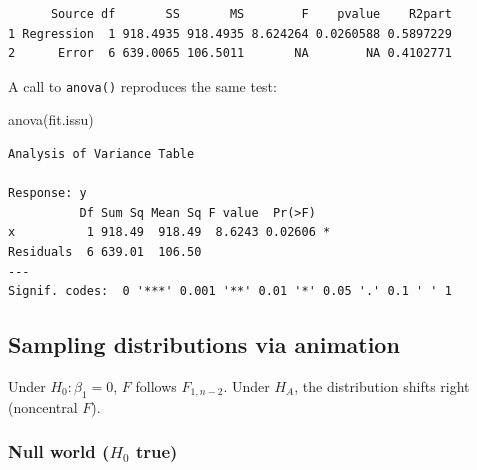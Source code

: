 \documentclass[
  letterpaper,
]{scrbook}
\newenvironment{Shaded}{\begin{snugshade}}{\end{snugshade}}
\newcommand{\FunctionTok}[1]{\textcolor[rgb]{0.28,0.35,0.67}{#1}}
\newcommand{\NormalTok}[1]{\textcolor[rgb]{0.00,0.23,0.31}{#1}}
\begin{document}
\begin{verbatim}
      Source df       SS       MS        F    pvalue    R2part
1 Regression  1 918.4935 918.4935 8.624264 0.0260588 0.5897229
2      Error  6 639.0065 106.5011       NA        NA 0.4102771
\end{verbatim}

A call to \texttt{anova()} reproduces the same test:

\begin{Shaded}
\begin{Highlighting}[]
\FunctionTok{anova}\NormalTok{(fit.issu)}
\end{Highlighting}
\end{Shaded}

\begin{verbatim}
Analysis of Variance Table

Response: y
          Df Sum Sq Mean Sq F value  Pr(>F)  
x          1 918.49  918.49  8.6243 0.02606 *
Residuals  6 639.01  106.50                  
---
Signif. codes:  0 '***' 0.001 '**' 0.01 '*' 0.05 '.' 0.1 ' ' 1
\end{verbatim}

\subsection{Sampling distributions via
animation}\label{sampling-distributions-via-animation}

Under \(H_0:\beta_1=0\), \(F\) follows \(F_{1,n-2}\). Under \(H_A\), the
distribution shifts right (noncentral \(F\)).

\subsubsection{\texorpdfstring{Null world (\(H_0\)
true)}{Null world (H\_0 true)}}\label{null-world-h_0-true}
\end{document}
